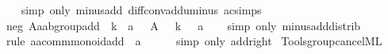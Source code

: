 \begin{isabellebody}
%
\isadelimproof
\ \ %
\endisadelimproof
%
\isatagproof
{}\isamarkupfalse%
\ {\isacharparenleft}{\kern0pt}simp\ only{\isacharcolon}{\kern0pt}\ minus{\isacharunderscore}{\kern0pt}add\ diff{\isacharunderscore}{\kern0pt}conv{\isacharunderscore}{\kern0pt}add{\isacharunderscore}{\kern0pt}uminus\ ac{\isacharunderscore}{\kern0pt}simps{\isacharparenright}{\kern0pt}%
\endisatagproof
{\isafoldproof}%
%
\isadelimproof
\isanewline
%
\endisadelimproof
\isanewline
{}\isamarkupfalse%
\ neg{}{\isacharcolon}{\kern0pt}\ {\isachardoublequoteopen}{\isacharparenleft}{\kern0pt}A{\isacharcolon}{\kern0pt}{\isacharcolon}{\kern0pt}{\isacharprime}{\kern0pt}a{\isacharcolon}{\kern0pt}{\isacharcolon}{\kern0pt}ab{\isacharunderscore}{\kern0pt}group{\isacharunderscore}{\kern0pt}add{\isacharparenright}{\kern0pt}\ {\isasymequiv}\ k\ {\isacharplus}{\kern0pt}\ a\ {\isasymLongrightarrow}\ {\isacharminus}{\kern0pt}\ A\ {\isasymequiv}\ {\isacharminus}{\kern0pt}\ k\ {\isacharplus}{\kern0pt}\ {\isacharminus}{\kern0pt}\ a{\isachardoublequoteclose}\isanewline
%
\isadelimproof
\ \ %
\endisadelimproof
%
\isatagproof
{}\isamarkupfalse%
\ {\isacharparenleft}{\kern0pt}simp\ only{\isacharcolon}{\kern0pt}\ minus{\isacharunderscore}{\kern0pt}add{\isacharunderscore}{\kern0pt}distrib{\isacharparenright}{\kern0pt}%
\endisatagproof
{\isafoldproof}%
%
\isadelimproof
\isanewline
%
\endisadelimproof
\isanewline
{}\isamarkupfalse%
\ rule{}{\isacharcolon}{\kern0pt}\ {\isachardoublequoteopen}{\isacharparenleft}{\kern0pt}a{\isacharcolon}{\kern0pt}{\isacharcolon}{\kern0pt}{\isacharprime}{\kern0pt}a{\isacharcolon}{\kern0pt}{\isacharcolon}{\kern0pt}comm{\isacharunderscore}{\kern0pt}monoid{\isacharunderscore}{\kern0pt}add{\isacharparenright}{\kern0pt}\ {\isasymequiv}\ a\ {\isacharplus}{\kern0pt}\ {}{\isachardoublequoteclose}\isanewline
%
\isadelimproof
\ \ %
\endisadelimproof
%
\isatagproof
{}\isamarkupfalse%
\ {\isacharparenleft}{\kern0pt}simp\ only{\isacharcolon}{\kern0pt}\ add{\isacharunderscore}{\kern0pt}{}{\isacharunderscore}{\kern0pt}right{\isacharparenright}{\kern0pt}%
\endisatagproof
{\isafoldproof}%
%
\isadelimproof
\isanewline
%
\endisadelimproof
\isanewline
{}\isamarkupfalse%
\isanewline
%
\isadelimML
\isanewline
%
\endisadelimML
%
\isatagML
{}\isamarkupfalse%
\ {\isacartoucheopen}Tools{\isacharslash}{\kern0pt}group{\isacharunderscore}{\kern0pt}cancel{\isachardot}{\kern0pt}ML{\isacartoucheclose}\isanewline
\isanewline
{}\isamarkupfalse%

\end{isabellebody}
